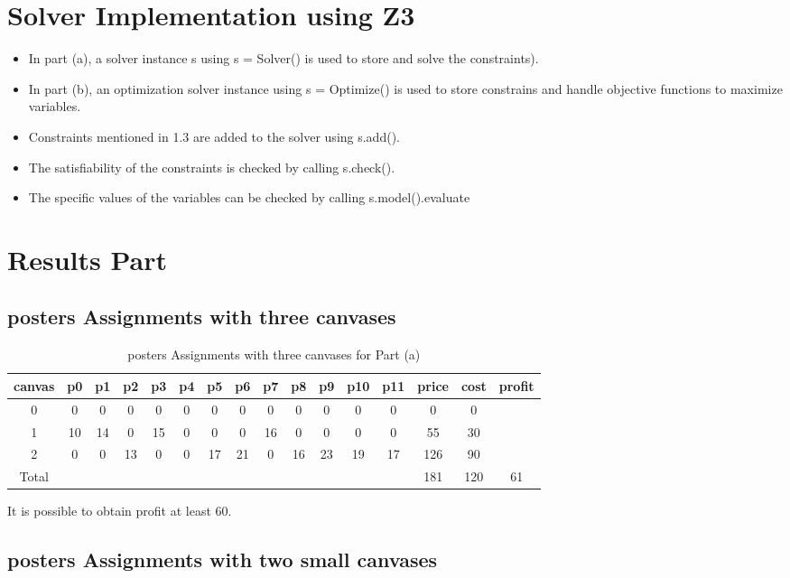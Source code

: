 \documentclass{article}
\begin{document}
\section{Solver Implementation using Z3}

\begin{itemize}
    \item In part (a), a solver instance s using s = Solver() is used to store and solve the constraints). 
    \item In part (b), an optimization solver instance using s = Optimize() is used to store constrains and handle objective functions to maximize variables.
    \item Constraints mentioned in 1.3 are added to the solver using s.add().
    \item The satisfiability of the constraints is checked by calling s.check().
    \item The specific values of the variables can be checked by calling s.model().evaluate
\end{itemize}

\section{Results Part}

\subsection{posters Assignments with three canvases}

\begin{table}[H]
\centering
\caption{posters Assignments with three canvases for Part (a)}
\small
\begin{tabular}{c|cccccccccccc|c|c|c}
\toprule
canvas & p0 & p1 & p2 & p3 & p4  & p5 & p6 & p7 & p8 & p9 & p10 & p11 & price & cost & profit\\
\midrule
0 & 0 & 0 & 0 & 0 & 0 & 0 & 0 & 0 & 0 & 0 & 0 & 0 & 0 & 0 &\\
1 & 10 & 14 & 0 & 15 & 0 & 0 & 0 & 16 & 0 & 0 & 0 & 0 & 55 & 30 &\\
2 & 0 & 0 & 13 & 0 & 0 & 17 & 21 & 0 & 16 & 23 & 19 & 17 & 126 & 90 &\\
\midrule
Total & & & & & & & & & & & & & 181 & 120 & 61\\
\bottomrule
\end{tabular}
\end{table}
It is possible to obtain profit at least 60.

\subsection{posters Assignments with two small canvases}
\end{document}
